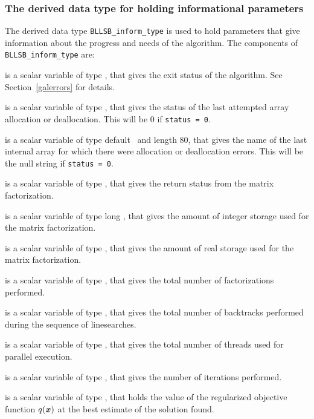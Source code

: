 \documentclass{galahad}
\newcommand{\packagename}{BLLSB}
\begin{document}

\subsubsection{The derived data type for holding informational
 parameters}\label{typeinform}
The derived data type
{\tt \packagename\_inform\_type}
is used to hold parameters that give information about the progress and needs
of the algorithm. The components of
{\tt \packagename\_inform\_type}
are:

\begin{description}

 is a scalar variable of type \integer, that gives the
exit status of the algorithm.
See Section~\ref{galerrors}
for details.

 is a scalar variable of type \integer, that gives
the status of the last attempted array allocation or deallocation.
This will be 0 if {\tt status = 0}.

 is a scalar variable of type default \character\
and length 80, that  gives the name of the last internal array
for which there were allocation or deallocation errors.
This will be the null string if {\tt status = 0}.

 is a scalar variable of type \integer, that
gives the return status from the matrix factorization.

 is a scalar variable of type long
\integer, that gives the amount of integer storage used for the matrix
factorization.

 is a scalar variable of type \longinteger,
that gives the amount of real storage used for the matrix factorization.

 is a scalar variable of type \integer, that gives the
total number of factorizations performed.

 is a scalar variable of type \integer, that gives the
total number of backtracks performed during the sequence of linesearches.

 is a scalar variable of type \integer, that gives the
total number of threads used for parallel execution.

 is a scalar variable of type \integer, that
gives the number of iterations performed.

 is a scalar variable of type \realdp, that holds the
value of the regularized objective function  $q({\bm{x}})$ at the 
best estimate of the solution found.


\end{description}
\end{document}
